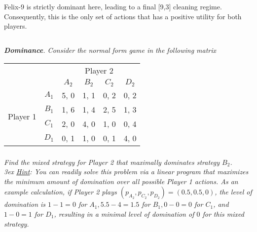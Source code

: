 \documentclass[12pt]{amsart}
\begin{document}
	Felix-9 is strictly dominant here, leading to a final [9,3] cleaning regime. 
	Consequently, this is the only set of actions that has a positive utility for both players. \\
	
	

\subsection{}
\textit{\textbf{Dominance}. Consider the normal form game in the following matrix}

\begin{center}
	\def\arraystretch{1.25}%
	\begin{tabular}{cccccc}
		&                            &                            & \multicolumn{2}{c}{Player 2}                            &                            \\
		& \multicolumn{1}{c|}{}      & \multicolumn{1}{c|}{$A_2$} & \multicolumn{1}{c|}{$B_2$} & \multicolumn{1}{c|}{$C_2$} & \multicolumn{1}{c|}{$D_2$} \\ \cline{2-6} 
		& \multicolumn{1}{c|}{$A_1$} & \multicolumn{1}{c|}{5, 0}  & \multicolumn{1}{c|}{1, 1}  & \multicolumn{1}{c|}{0, 2}  & \multicolumn{1}{c|}{0, 2}  \\ \cline{2-6} 
		\multirow{2}{*}{Player 1} & \multicolumn{1}{c|}{$B_1$} & \multicolumn{1}{c|}{1, 6}  & \multicolumn{1}{c|}{1, 4}  & \multicolumn{1}{c|}{2, 5}  & \multicolumn{1}{c|}{1, 3}  \\ \cline{2-6} 
		& \multicolumn{1}{c|}{$C_1$} & \multicolumn{1}{c|}{2, 0}  & \multicolumn{1}{c|}{4, 0}  & \multicolumn{1}{c|}{1, 0}  & \multicolumn{1}{c|}{0, 4}  \\ \cline{2-6} 
		& \multicolumn{1}{c|}{$D_1$} & \multicolumn{1}{c|}{0, 1}  & \multicolumn{1}{c|}{1, 0}  & \multicolumn{1}{c|}{0, 1}  & \multicolumn{1}{c|}{4, 0}  \\ \cline{2-6} 
	\end{tabular}
\end{center}

	\subsubsection{}
	\textit{Find the mixed strategy for Player 2 that maximally dominates strategy $B_2$. \\3ex %
%
	\underline{Hint}: You can readily solve this problem via a linear program that maximizes the
	minimum amount of domination over all possible Player 1 actions. As an example
	calculation, if Player 2 plays $(p_{A_2},p_{C_2},p_{D_2}) = (0.5,0.5,0)$, 
	the level of domination is $1 − 1 = 0$ for $A_1, 5.5 - 4 = 1.5$ for 
	$B_1, 0 - 0 = 0$ for $C_1$, and $1 − 0 = 1$ for $D_1$, resulting in a
	minimal level of domination of $0$ for this mixed strategy.}
\end{document}
